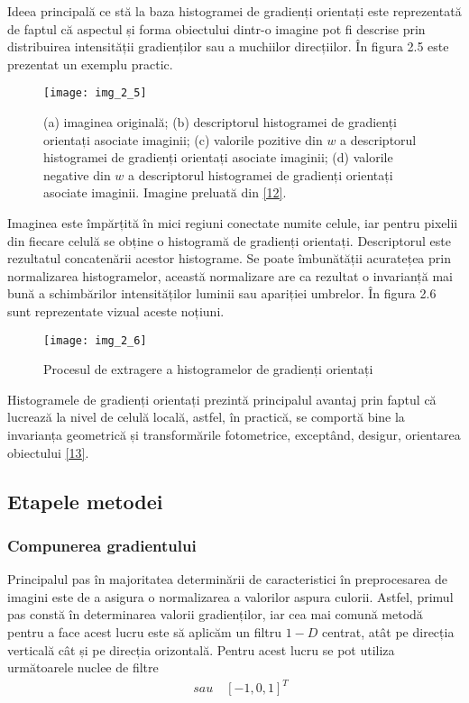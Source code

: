 Ideea principală ce stă la baza histogramei de gradienți orientați este reprezentată de faptul că aspectul și forma obiectului dintr-o imagine pot fi descrise prin distribuirea intensității gradienților sau a muchiilor direcțiilor. În figura 2.5 este prezentat un exemplu practic.
\begin{figure}[!h]
	\centering
	\texttt{[image: img\_2\_5]}
	\caption[Descriptor HOG]{(a) imaginea originală; (b) descriptorul histogramei de gradienți orientați asociate imaginii; (c) valorile pozitive din $w$ a descriptorul histogramei de gradienți orientați asociate imaginii; (d) valorile negative din $w$ a descriptorul histogramei de gradienți orientați asociate imaginii. Imagine preluată din \hyperlink{NavneetDalalBillTriggs}{[12]}.}
\end{figure}

Imaginea este împărțită în mici regiuni conectate numite celule, iar pentru pixelii din fiecare celulă se obține o histogramă de gradienți orientați. Descriptorul este rezultatul concatenării acestor histograme. Se poate îmbunătății acuratețea prin normalizarea histogramelor, această normalizare are ca rezultat o invarianță mai bună a schimbărilor intensităților luminii sau apariției umbrelor. În figura 2.6 sunt reprezentate vizual aceste noțiuni.
\begin{figure}[!h]
	\centering
	\texttt{[image: img\_2\_6]}
	\caption{Procesul de extragere a histogramelor de gradienți orientați}
\end{figure}

Histogramele de gradienți orientați prezintă principalul avantaj prin faptul că lucrează la nivel de celulă locală, astfel, în practică, se comportă bine la invarianța geometrică și transformările fotometrice, exceptând, desigur, orientarea obiectului \hyperlink{RichardSzeliski}{[13]}. 

\subsection{Etapele metodei}

\subsubsection {Compunerea gradientului}

Principalul pas în majoritatea determinării de caracteristici în preprocesarea de imagini este de a asigura o normalizarea a valorilor aspura culorii. Astfel, primul pas constă în determinarea valorii gradienților, iar cea mai comună metodă pentru a face acest lucru este să aplicăm un filtru $1-D$ centrat, atât pe direcția verticală cât și pe direcția orizontală. Pentru acest lucru se pot utiliza următoarele nuclee de filtre
\begin{align}	
	[-1, 0, 1]  \quad sau  \quad  [-1, 0, 1]^T
\end{align}

